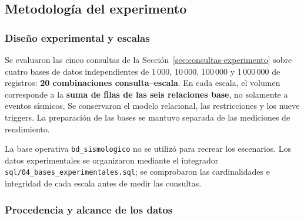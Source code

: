 \documentclass[12pt,a4paper]{article}
\begin{document}
\subsection{Metodología del experimento}
\label{sec:metodologia-experimento}

\subsubsection{Diseño experimental y escalas}

Se evaluaron las cinco consultas de la Sección~\ref{sec:consultas-experimento}
sobre cuatro bases de datos independientes de 1\,000, 10\,000,
100\,000 y 1\,000\,000 de registros: \textbf{20 combinaciones
consulta--escala}. En cada escala, el volumen corresponde a la
\textbf{suma de filas de las seis relaciones base}, no solamente a
eventos sísmicos. Se conservaron el modelo relacional, las
restricciones y los nueve triggers. La preparación de las bases
se mantuvo separada de las mediciones de rendimiento.

\begin{table}[H]
\centering\small
{}

\caption{Distribución de registros de las cuatro bases experimentales.}
\label{tab:plan-volumenes-52}
\end{table}

La base operativa \texttt{bd\_sismologico} no se utilizó para
recrear los escenarios. Los datos experimentales se organizaron
mediante el integrador \nolinkurl{sql/04_bases_experimentales.sql};
se comprobaron las cardinalidades e integridad de cada escala antes
de medir las consultas.

\subsubsection{Procedencia y alcance de los datos}
\end{document}

